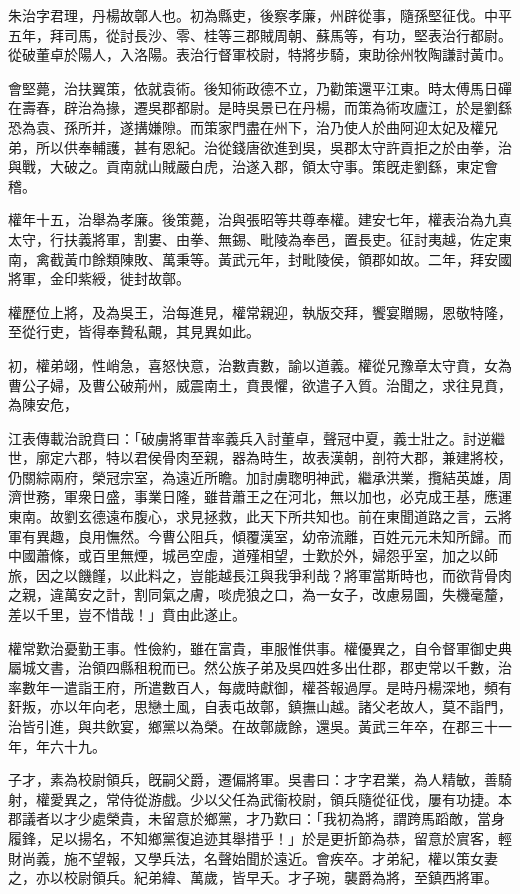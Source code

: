 
\begin{pinyinscope}
朱治字君理，丹楊故鄣人也。初為縣吏，後察孝廉，州辟從事，隨孫堅征伐。中平五年，拜司馬，從討長沙、零、桂等三郡賊周朝、蘇馬等，有功，堅表治行都尉。從破董卓於陽人，入洛陽。表治行督軍校尉，特將步騎，東助徐州牧陶謙討黃巾。

會堅薨，治扶翼策，依就袁術。後知術政德不立，乃勸策還平江東。時太傅馬日磾在壽春，辟治為掾，遷吳郡都尉。是時吳景已在丹楊，而策為術攻廬江，於是劉繇恐為袁、孫所并，遂搆嫌隙。而策家門盡在州下，治乃使人於曲阿迎太妃及權兄弟，所以供奉輔護，甚有恩紀。治從錢唐欲進到吳，吳郡太守許貢拒之於由拳，治與戰，大破之。貢南就山賊嚴白虎，治遂入郡，領太守事。策旣走劉繇，東定會稽。

權年十五，治舉為孝廉。後策薨，治與張昭等共尊奉權。建安七年，權表治為九真太守，行扶義將軍，割婁、由拳、無錫、毗陵為奉邑，置長吏。征討夷越，佐定東南，禽截黃巾餘類陳敗、萬秉等。黃武元年，封毗陵侯，領郡如故。二年，拜安國將軍，金印紫綬，徙封故鄣。

權歷位上將，及為吳王，治每進見，權常親迎，執版交拜，饗宴贈賜，恩敬特隆，至從行吏，皆得奉贄私覿，其見異如此。

初，權弟翊，性峭急，喜怒快意，治數責數，諭以道義。權從兄豫章太守賁，女為曹公子婦，及曹公破荊州，威震南土，賁畏懼，欲遣子入質。治聞之，求往見賁，為陳安危，

江表傳載治說賁曰：「破虜將軍昔率義兵入討董卓，聲冠中夏，義士壯之。討逆繼世，廓定六郡，特以君侯骨肉至親，器為時生，故表漢朝，剖符大郡，兼建將校，仍關綜兩府，榮冠宗室，為遠近所瞻。加討虜聦明神武，繼承洪業，攬結英雄，周濟世務，軍衆日盛，事業日隆，雖昔蕭王之在河北，無以加也，必克成王基，應運東南。故劉玄德遠布腹心，求見拯救，此天下所共知也。前在東聞道路之言，云將軍有異趣，良用憮然。今曹公阻兵，傾覆漢室，幼帝流離，百姓元元未知所歸。而中國蕭條，或百里無煙，城邑空虛，道殣相望，士歎於外，婦怨乎室，加之以師旅，因之以饑饉，以此料之，豈能越長江與我爭利哉？將軍當斯時也，而欲背骨肉之親，違萬安之計，割同氣之膚，啖虎狼之口，為一女子，改慮易圖，失機毫釐，差以千里，豈不惜哉！」賁由此遂止。

權常歎治憂勤王事。性儉約，雖在富貴，車服惟供事。權優異之，自令督軍御史典屬城文書，治領四縣租稅而已。然公族子弟及吳四姓多出仕郡，郡吏常以千數，治率數年一遣詣王府，所遣數百人，每歲時獻御，權荅報過厚。是時丹楊深地，頻有姧叛，亦以年向老，思戀土風，自表屯故鄣，鎮撫山越。諸父老故人，莫不詣門，治皆引進，與共飲宴，鄉黨以為榮。在故鄣歲餘，還吳。黃武三年卒，在郡三十一年，年六十九。

子才，素為校尉領兵，旣嗣父爵，遷偏將軍。吳書曰：才字君業，為人精敏，善騎射，權愛異之，常侍從游戲。少以父任為武衞校尉，領兵隨從征伐，屢有功捷。本郡議者以才少處榮貴，未留意於鄉黨，才乃歎曰：「我初為將，謂跨馬蹈敵，當身履鋒，足以揚名，不知鄉黨復追迹其舉措乎！」於是更折節為恭，留意於賔客，輕財尚義，施不望報，又學兵法，名聲始聞於遠近。會疾卒。才弟紀，權以策女妻之，亦以校尉領兵。紀弟緯、萬歲，皆早夭。才子琬，襲爵為將，至鎮西將軍。


\end{pinyinscope}